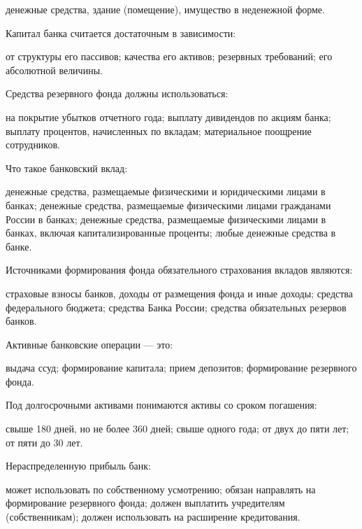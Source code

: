 \documentclass[12pt, table]{exam}
\begin{document}
\begin{questions}
\begin{multicols}{2}
\begin{choices}
	 \choice денежные средства, здание (помещение), имущество в неденежной форме.
	 \end{choices}
\question Капитал банка считается достаточным в зависимости:
	 \begin{choices}
	 \choice от структуры его пассивов;
	 \CC качества его активов;
	 \choice резервных требований;
	 \choice его абсолютной величины.
	 \end{choices}
\question Средства резервного фонда должны использоваться:
	 \begin{choices}
	 \choice на покрытие убытков отчетного года;
	 \choice выплату дивидендов по акциям банка;
	 \choice выплату процентов, начисленных по вкладам;
	 \CC материальное поощрение сотрудников.
	 \end{choices}
\question Что такое банковский вклад:
	 \begin{choices}
	 \CC денежные средства, размещаемые физическими и юридическими лицами в банках;
	 \choice денежные средства, размещаемые физическими лицами  гражданами России в банках;
	 \choice денежные средства, размещаемые физическими лицами в банках, включая капитализированные проценты;
	 \choice любые денежные средства в банке.
	 \end{choices}
\question Источниками формирования фонда обязательного страхования вкладов являются:
	 \begin{choices}
	 \choice страховые взносы банков, доходы от размещения фонда и иные доходы;
	 \CC средства федерального бюджета;
	 \choice средства Банка России;
	 \choice средства обязательных резервов банков.
	 \end{choices}
\question Активные банковские операции — это:
	 \begin{choices}
	 \choice выдача ссуд;
	 \choice формирование капитала;
	 \CC прием депозитов;
	 \choice формирование резервного фонда.
	 \end{choices}
\question Под долгосрочными активами понимаются активы со сроком погашения:
	 \begin{choices}
	 \choice свыше 180 дней, но не более 360 дней;
	 \choice свыше одного года;
	 \choice от двух до пяти лет;
	 \CC от пяти до 30 лет.
	 \end{choices}
\question Нераспределенную прибыль банк:
	 \begin{choices}
	 \choice может использовать по собственному усмотрению;
	 \CC обязан направлять на формирование резервного фонда;
	 \choice должен выплатить учредителям (собственникам);
	 \choice должен использовать на расширение кредитования.

\end{choices}
\end{multicols}
\end{questions}
\end{document}
